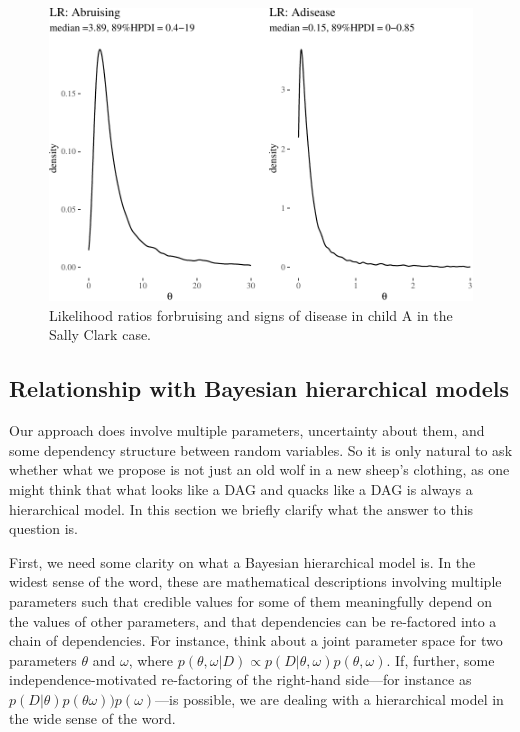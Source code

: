 \documentclass[
  10pt,
  dvipsnames,enabledeprecatedfontcommands]{scrartcl}
\begin{document}
\begin{figure}[H]


\begin{center}\includegraphics[width=0.9\linewidth]{paper-outline_files/figure-latex/SClrs-1} \end{center}

\caption{Likelihood ratios forbruising and signs of disease in child A in the Sally Clark case.}
\label{fig:SClrs}

\end{figure}

\hypertarget{relationship-with-bayesian-hierarchical-models}{%
\subsection{Relationship with Bayesian hierarchical
models}\label{relationship-with-bayesian-hierarchical-models}}

Our approach does involve multiple parameters, uncertainty about them,
and some dependency structure between random variables. So it is only
natural to ask whether what we propose is not just an old wolf in a new
sheep's clothing, as one might think that what looks like a DAG and
quacks like a DAG is always a hierarchical model. In this section we
briefly clarify what the answer to this question is.

First, we need some clarity on what a Bayesian hierarchical model is. In
the widest sense of the word, these are mathematical descriptions
involving multiple parameters such that credible values for some of them
meaningfully depend on the values of other parameters, and that
dependencies can be re-factored into a chain of dependencies. For
instance, think about a joint parameter space for two parameters
\(\theta\) and \(\omega\), where
\(p(\theta, \omega \vert D) \propto p(D \vert \theta, \omega)p(\theta, \omega)\).
If, further, some independence-motivated re-factoring of the right-hand
side---for instance as
\(p(D\vert \theta)p(\theta \omega)) p (\omega)\)---is possible, we are
dealing with a hierarchical model in the wide sense of the word.
\end{document}
